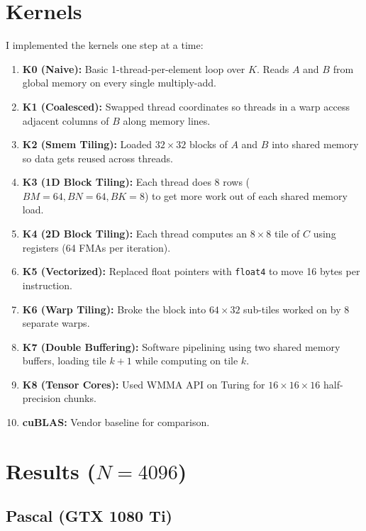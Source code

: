 \documentclass[11pt]{article}
\begin{document}
\section{Kernels}

I implemented the kernels one step at a time:
\begin{enumerate}
    \item \textbf{K0 (Naive):} Basic 1-thread-per-element loop over $K$. Reads $A$ and $B$ from global memory on every single multiply-add.
    \item \textbf{K1 (Coalesced):} Swapped thread coordinates so threads in a warp access adjacent columns of $B$ along memory lines.
    \item \textbf{K2 (Smem Tiling):} Loaded $32 \times 32$ blocks of $A$ and $B$ into shared memory so data gets reused across threads.
    \item \textbf{K3 (1D Block Tiling):} Each thread does 8 rows ($BM=64, BN=64, BK=8$) to get more work out of each shared memory load.
    \item \textbf{K4 (2D Block Tiling):} Each thread computes an $8 \times 8$ tile of $C$ using registers (64 FMAs per iteration).
    \item \textbf{K5 (Vectorized):} Replaced float pointers with \texttt{float4} to move 16 bytes per instruction.
    \item \textbf{K6 (Warp Tiling):} Broke the block into $64 \times 32$ sub-tiles worked on by 8 separate warps.
    \item \textbf{K7 (Double Buffering):} Software pipelining using two shared memory buffers, loading tile $k+1$ while computing on tile $k$.
    \item \textbf{K8 (Tensor Cores):} Used WMMA API on Turing for $16 \times 16 \times 16$ half-precision chunks.
    \item \textbf{cuBLAS:} Vendor baseline for comparison.
\end{enumerate}

\section{Results ($N=4096$)}

\subsection{Pascal (GTX 1080 Ti)}
\end{document}

